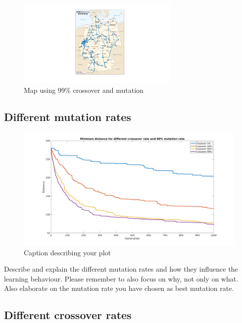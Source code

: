 \documentclass[a4paper, 12pt]{article}
\begin{document}
\begin{figure}[ht!]
  \centering
  \includegraphics[width=0.7\textwidth]{images/resultmap-mine}
    \caption{Map using 99\% crossover and mutation \label{fig:xxx1}}
\end{figure}

\newpage
\subsection{Different mutation rates}

\begin{figure}[ht!]
	\centering
	\includegraphics[width=1.0\textwidth]{images/crossfig-mine}
	\caption{Caption describing your plot \label{fig:crossfig}}
\end{figure}

Describe and explain the different mutation rates and how they influence the learning behaviour. Please remember to also focus on why, not only on what.
Also elaborate on the mutation rate you have chosen as best mutation rate.

\newpage

\subsection{Different crossover rates}
\end{document}
